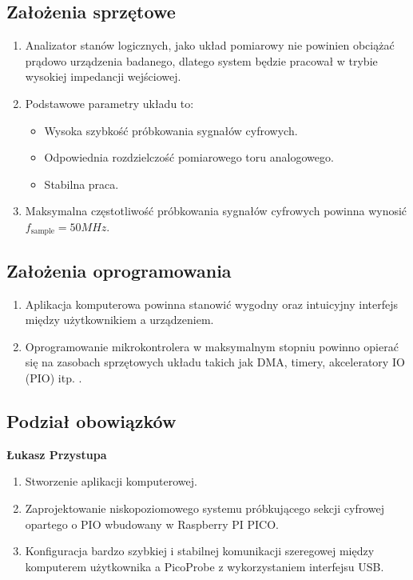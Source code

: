 \subsection{Założenia sprzętowe}
    \begin{enumerate}
        \item Analizator stanów logicznych, jako układ pomiarowy nie powinien obciążać prądowo
        urządzenia badanego, dlatego system będzie pracował w trybie
        wysokiej impedancji wejściowej.
        \item Podstawowe parametry układu to:
        \begin{itemize}
            \item Wysoka szybkość próbkowania sygnałów cyfrowych.
            \item Odpowiednia rozdzielczość pomiarowego toru analogowego.
            \item Stabilna praca.
        \end{itemize}
        \item Maksymalna częstotliwość próbkowania sygnałów cyfrowych powinna wynosić $f_{\text{sample}} = 50MHz$.
    \end{enumerate}

\subsection{Założenia oprogramowania}
    \begin{enumerate}
        \item Aplikacja komputerowa powinna stanowić wygodny oraz intuicyjny interfejs
        między użytkownikiem a urządzeniem.
        \item Oprogramowanie mikrokontrolera w maksymalnym stopniu powinno opierać się na
        zasobach sprzętowych układu takich jak DMA, timery, akceleratory IO (PIO) itp. .
    \end{enumerate}

\subsection{Podział obowiązków}
    \textbf{Łukasz Przystupa}
    \begin{enumerate}
        \item Stworzenie aplikacji komputerowej.
        \item Zaprojektowanie niskopoziomowego systemu próbkującego sekcji cyfrowej opartego o PIO wbudowany w Raspberry PI PICO.
        \item Konfiguracja bardzo szybkiej i stabilnej komunikacji szeregowej między
        komputerem użytkownika a PicoProbe z wykorzystaniem interfejsu USB.
    \end{enumerate}

